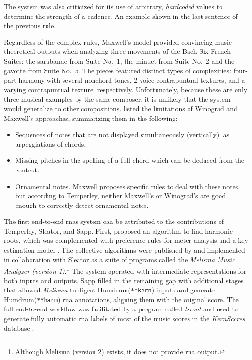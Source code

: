 The system was also criticized for its use of arbitrary,
\emph{hardcoded} values to determine the strength of a
cadence. An example shown in the last sentence of the
previous rule.

Regardless of the complex rules, Maxwell's model provided
convincing music-theoretical outputs when analyzing three
movements of the Bach Six French Suites: the sarabande from
Suite No.~1, the minuet from Suite No.~2 and the gavotte
from Suite No.~5. The pieces featured distinct types of
complexities: four-part harmony with several nonchord tones,
2-voice contrapuntual textures, and a varying contrapuntual
texture, respectively. Unfortunately, because these are only
three musical examples by the same composer, it is unlikely
that the system would generalize to other compositions.
\textcite{temperley1997algorithm} listed the limitations of
Winograd and Maxwell's approaches, summarizing them in the
following:

\begin{itemize}
    \item Sequences of notes that are not displayed
    simultaneously (vertically), as arpeggiations of chords.
    \item Missing pitches in the spelling of a full chord
    which can be deduced from the context.
    \item Ornamental notes. Maxwell proposes specific rules
    to deal with these notes, but according to Temperley,
    neither Maxwell's or Winograd's are good enough to
    correctly detect ornamental notes.
\end{itemize}


The first end-to-end \glspl{rna} system can be attributed to
the contributions of Temperley, Sleator, and Sapp. First,
\textcite{temperley1997algorithm} proposed an algorithm to
find harmonic roots, which was complemented with preference
rules for meter analysis \parencite{temperley1999modeling}
and a key estimation model \parencite{temperley1999whats}.
The collective algorithms were published by
\textcite{temperley2004cognition} and implemented in
collaboration with Sleator as a suite of programs called the
\emph{Melisma Music Analyzer (version
1)}.\footnote{Although
Melisma (version 2) exists, it does not provide \gls{rna}
output.} The system operated with intermediate
representations for both inputs and outputs. Sapp filled in
the remaining gap with additional stages that allowed
\emph{Melisma} to digest Humdrum(\texttt{**kern}) inputs and
generate Humdrum(\texttt{**harm}) \gls{rna} annotations,
aligning them with the original score. The full end-to-end
workflow was facilitated by a program called \emph{tsroot}
\parencite{sapp2009tsroot} and used to generate fully
automatic \gls{rna} labels of most of the music scores in
the \emph{KernScores} database \parencite{sapp2005online}.

